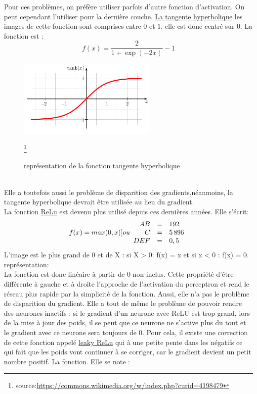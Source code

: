 \documentclass[openany,14pt,fleqn]{book} %
\begin{document}
Pour ces problèmes, on préfère utiliser parfois d'autre fonction d'activation. On peut cependant l'utiliser pour la dernière couche. \underline{La tangente hyperbolique} les images de cette fonction sont comprises entre 0 et 1, elle est donc centré sur 0. La fonction est : 
\[ f(x) = \frac{2}{1+\exp(-2x)}-1\]
\begin{figure}[h]
\centering\includegraphics[width=0.6\textwidth]{Pictures/Hyperbolic_Tangent_svg.png}
\caption{représentation de la fonction tangente hyperbolique} \footnote{source:\url{https://commons.wikimedia.org/w/index.php?curid=4198479}}
\end{figure}\\
Elle a toutefois aussi le problème de disparition des gradients,néanmoins, la tangente hyperbolique devrait être utilisée au lieu du gradient.\\
La fonction \underline{ReLu} est devenu plus utilisé depuis ces dernières années. Elle s'écrit: 
\[ f(x) = max(0,x)] ou    
\begin{array}{r c l} 
AB  & = & 192 
\\C   & = & 5\,896 
\\DEF & = & 0,5
   \end{array}\]
L'image est le plus grand de 0 et de X : si X > 0: f(x) = x et si x < 0 : f(x) = 0.\\
représentation: \\
La fonction est donc linéaire à partir de 0 non-inclus. Cette propriété d'être différente à gauche et à droite l'approche de l'activation du perceptron et rend le réseau plus rapide par la simplicité de la fonction. Aussi, elle n'a pas le problème de disparition du gradient. Elle a tout de même le problème de pouvoir rendre des neurones inactifs : si le gradient d'un neurone avec ReLU est trop grand, lors de la mise à jour des poids, il se peut que ce neurone ne s'active plus du tout et le gradient avec ce neurone sera toujours de 0. Pour cela, il existe une correction de cette fonction appelé \underline{leaky ReLu} qui à une petite pente dans les négatifs ce qui fait que les poids vont continuer à se corriger, car le gradient devient un petit nombre positif. La fonction. Elle se note : 
\end{document}
